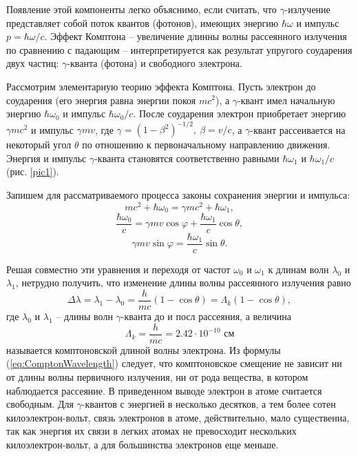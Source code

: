 \documentclass[a4paper, 12pt]{article}
\begin{document}
Появление этой компоненты легко объяснимо, если считать, что $\gamma$-излучение представляет собой поток квантов (фотонов), имеющих энергию $\hbar\omega$ и импульс $p=\hbar\omega/c$. Эффект Комптона -- увеличение длинны волны рассеянного излучения по сравнению с падающим -- интерпретируется как результат упругого соударения двух частиц: $\gamma$-кванта (фотона) и свободного электрона.\par
Рассмотрим элементарную теорию эффекта Комптона. Пусть электрон до соударения (его энергия равна энергии покоя $mc^2$), а $\gamma$-квант имел начальную энергию $\hbar\omega_0$ и импульс $\hbar\omega_0/c$. После соударения электрон приобретает энергию $\gamma mc^2$ и импульс $\gamma mv$, где $\gamma=(1-\beta^2)^{-1/2},\ \beta=v/c$, а $\gamma$-квант рассеивается на некоторый угол $\theta$ по отношению к первоначальному направлению движения. Энергия и импульс $\gamma$-кванта становятся соответственно равными $\hbar\omega_1$ и $\hbar\omega_1/c$ (рис. \ref{pic1}).\par
Запишем для рассматриваемого процесса законы сохранения энергии и импульса:
\begin{equation*}
	mc^2+\hbar\omega_0=\gamma mc^2+\hbar\omega_1,
\end{equation*}
\begin{equation*}
	\frac{\hbar\omega_0}{c}=\gamma mv\cos\varphi+\frac{\hbar\omega_1}{c}\cos\theta,
\end{equation*}
\begin{equation*}
	\gamma mv\sin\varphi=\frac{\hbar\omega_1}{c}\sin\theta.
\end{equation*}
\par
Решая совместно эти уравнения и переходя от частот $\omega_0$ и $\omega_1$ к длинам волн $\lambda_0$ и $\lambda_1$, нетрудно получить, что изменение длины волны рассеянного излучения равно
\begin{equation}
	\Delta\lambda=\lambda_1-\lambda_0=\frac{h}{mc}\left(1-\cos\theta\right)=\Lambda_k\left(1-\cos\theta\right),
	\label{eq:ComptonWavelength}
\end{equation}
где $\lambda_0$ и $\lambda_1$ -- длины волн $\gamma$-кванта до и посл рассеяния, а величина
\begin{equation*}
	\Lambda_k=\frac{h}{mc}=2.42\cdot10^{-10}\text{ см}
\end{equation*}
называется комптоновской длиной волны электрона. Из формулы (\ref{eq:ComptonWavelength}) следует, что комптоновское смещение не зависит ни от длины волны первичного излучения, ни от рода вещества, в котором наблюдается рассеяние. В приведенном выводе электрон в атоме считается свободным. Для $\gamma$-квантов с энергией в несколько десятков, а тем более сотен килоэлектрон-вольт, связь электронов в атоме, действительно, мало существенна, так как энергия их связи в легких атомах не превосходит нескольких килоэлектрон-вольт, а для большинства электронов еще меньше.\par
\end{document}
